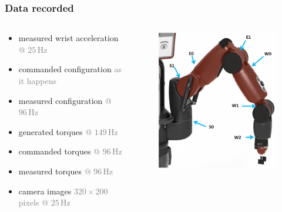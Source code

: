 \documentclass[%
USenglish,%
pdftex,%
compress,%
10pt,%
svgnames%
,handout
]
{beamer}
\begin{document}
\newcommand{\info}[1]{{\footnotesize\textcolor{gray}{#1}}}
\newcommand{\unit}[2]{\ensuremath{#1\,\mathrm{#2}}}

\begin{frame}
	\frametitle{Data recorded}
    \begin{columns}[onlytextwidth]
        \begin{column}{.6\textwidth}
            \begin{itemize}
                \item measured wrist acceleration \info{@ \unit{25}{Hz}}
                \item commanded configuration \info{as it happens}
                \item measured configuration \info{@ \unit{96}{Hz}}
                \item generated torques \info{@ \unit{149}{Hz}}
                \item commanded torques \info{@ \unit{96}{Hz}}
                \item measured torques \info{@ \unit{96}{Hz}}
                \item camera images \info{$320\times 200$ pixels @ \unit{25}{Hz}}
            \end{itemize}
        \end{column}
        \begin{column}{.4\textwidth}
            \begin{figure}
                \centering
                \includegraphics[width=.9\columnwidth]{figs/baxterjoints}
            \end{figure}
        \end{column}
    \end{columns}
\end{frame}
\end{document}
